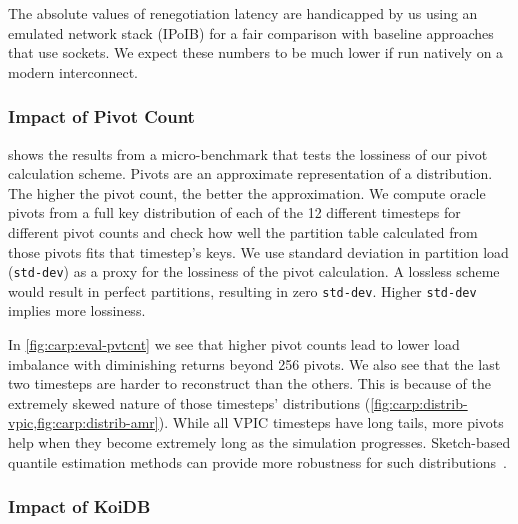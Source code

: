 The absolute values of renegotiation latency are handicapped by us using an emulated network stack
(IPoIB) for a fair comparison with baseline approaches that use sockets.
We expect these numbers to be much lower if run natively on a modern interconnect.

\subsubsection{Impact of Pivot Count}
\label{sec:carp:eval_pvtcnt}

\figCarpEvalPvtCnt

 shows the results from a micro-benchmark that tests the lossiness of
our pivot calculation scheme.
Pivots are an approximate representation of a distribution.
The higher the pivot count, the better the approximation.
We compute oracle pivots from a full key distribution of each of the 12 different timesteps for
different pivot counts and check how well the partition table calculated from those pivots fits
that timestep's keys.
We use standard deviation in partition load (\texttt{std-dev}) as a proxy for the lossiness of the
pivot calculation.
A lossless scheme would result in perfect partitions, resulting in zero \texttt{std-dev}.
Higher \texttt{std-dev} implies more lossiness.

In \cref{fig:carp:eval-pvtcnt} we see that higher pivot counts lead to lower load imbalance with
diminishing returns beyond 256 pivots.
We also see that the last two timesteps are harder to reconstruct than the others.
This is because of the extremely skewed nature of those timesteps' distributions
(\cref{fig:carp:distrib-vpic,fig:carp:distrib-amr}).
While all VPIC timesteps have long tails, more pivots help when they become extremely long
as the simulation progresses.
Sketch-based quantile estimation methods can provide more robustness for such distributions~\cite{Karni2016:KLLSketch}.

\subsubsection{Impact of KoiDB}
\label{sec:carp:eval_carpdb}

\figCarpEvalCarpdb

